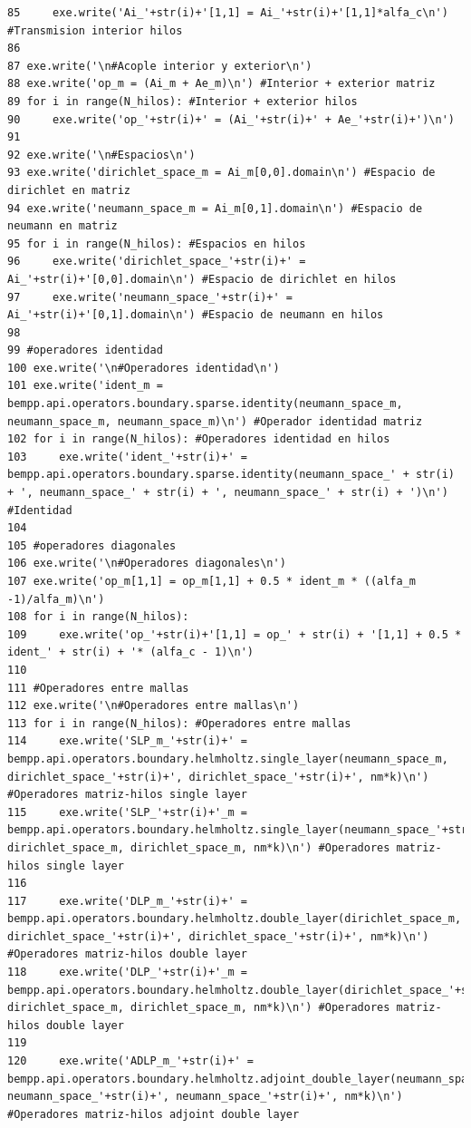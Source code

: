 \documentclass[12pt,letterpaper]{article}
\numberwithin{equation}{section}
\begin{document}
\begin{lstlisting}
85     exe.write('Ai_'+str(i)+'[1,1] = Ai_'+str(i)+'[1,1]*alfa_c\n') #Transmision interior hilos
86 
87 exe.write('\n#Acople interior y exterior\n')
88 exe.write('op_m = (Ai_m + Ae_m)\n') #Interior + exterior matriz
89 for i in range(N_hilos): #Interior + exterior hilos
90     exe.write('op_'+str(i)+' = (Ai_'+str(i)+' + Ae_'+str(i)+')\n')
91 
92 exe.write('\n#Espacios\n')
93 exe.write('dirichlet_space_m = Ai_m[0,0].domain\n') #Espacio de dirichlet en matriz
94 exe.write('neumann_space_m = Ai_m[0,1].domain\n') #Espacio de neumann en matriz
95 for i in range(N_hilos): #Espacios en hilos
96     exe.write('dirichlet_space_'+str(i)+' = Ai_'+str(i)+'[0,0].domain\n') #Espacio de dirichlet en hilos
97     exe.write('neumann_space_'+str(i)+' = Ai_'+str(i)+'[0,1].domain\n') #Espacio de neumann en hilos
98 
99 #operadores identidad
100 exe.write('\n#Operadores identidad\n')
101 exe.write('ident_m = bempp.api.operators.boundary.sparse.identity(neumann_space_m, neumann_space_m, neumann_space_m)\n') #Operador identidad matriz
102 for i in range(N_hilos): #Operadores identidad en hilos
103     exe.write('ident_'+str(i)+' = bempp.api.operators.boundary.sparse.identity(neumann_space_' + str(i) + ', neumann_space_' + str(i) + ', neumann_space_' + str(i) + ')\n') #Identidad
104 
105 #operadores diagonales
106 exe.write('\n#Operadores diagonales\n')
107 exe.write('op_m[1,1] = op_m[1,1] + 0.5 * ident_m * ((alfa_m -1)/alfa_m)\n')
108 for i in range(N_hilos):
109     exe.write('op_'+str(i)+'[1,1] = op_' + str(i) + '[1,1] + 0.5 * ident_' + str(i) + '* (alfa_c - 1)\n')
110 
111 #Operadores entre mallas
112 exe.write('\n#Operadores entre mallas\n')
113 for i in range(N_hilos): #Operadores entre mallas 
114     exe.write('SLP_m_'+str(i)+' = bempp.api.operators.boundary.helmholtz.single_layer(neumann_space_m, dirichlet_space_'+str(i)+', dirichlet_space_'+str(i)+', nm*k)\n') #Operadores matriz-hilos single layer
115     exe.write('SLP_'+str(i)+'_m = bempp.api.operators.boundary.helmholtz.single_layer(neumann_space_'+str(i)+', dirichlet_space_m, dirichlet_space_m, nm*k)\n') #Operadores matriz-hilos single layer
116 
117     exe.write('DLP_m_'+str(i)+' = bempp.api.operators.boundary.helmholtz.double_layer(dirichlet_space_m, dirichlet_space_'+str(i)+', dirichlet_space_'+str(i)+', nm*k)\n') #Operadores matriz-hilos double layer
118     exe.write('DLP_'+str(i)+'_m = bempp.api.operators.boundary.helmholtz.double_layer(dirichlet_space_'+str(i)+', dirichlet_space_m, dirichlet_space_m, nm*k)\n') #Operadores matriz-hilos double layer
119 
120     exe.write('ADLP_m_'+str(i)+' = bempp.api.operators.boundary.helmholtz.adjoint_double_layer(neumann_space_m, neumann_space_'+str(i)+', neumann_space_'+str(i)+', nm*k)\n') #Operadores matriz-hilos adjoint double layer

\end{lstlisting}
\end{document}

